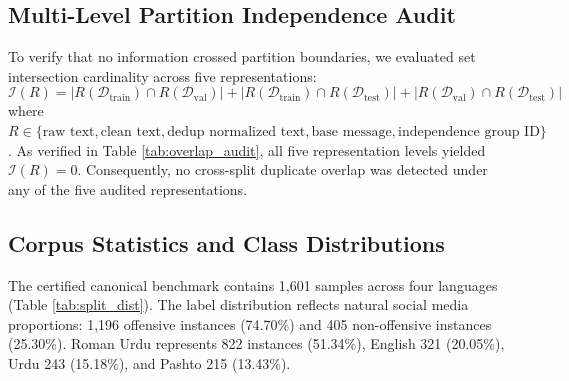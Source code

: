 \documentclass[11pt,a4paper]{article}
\begin{document}
\subsection{Multi-Level Partition Independence Audit}
To verify that no information crossed partition boundaries, we evaluated set intersection cardinality across five representations:
\begin{equation}
    \mathcal{I}(R) = |R(\mathcal{D}_{\text{train}}) \cap R(\mathcal{D}_{\text{val}})| + |R(\mathcal{D}_{\text{train}}) \cap R(\mathcal{D}_{\text{test}})| + |R(\mathcal{D}_{\text{val}}) \cap R(\mathcal{D}_{\text{test}})|
\end{equation}
where $R \in \{\text{raw text}, \text{clean text}, \text{dedup normalized text}, \text{base message}, \text{independence group ID}\}$. As verified in Table \ref{tab:overlap_audit}, all five representation levels yielded $\mathcal{I}(R) = 0$. Consequently, no cross-split duplicate overlap was detected under any of the five audited representations.

\begin{table}[t]
\centering
\small
\caption{\textbf{Five-level cross-partition overlap audit across train, validation, and test splits.}}
\label{tab:overlap_audit}
\end{table}

\subsection{Corpus Statistics and Class Distributions}
The certified canonical benchmark contains 1,601 samples across four languages (Table \ref{tab:split_dist}). The label distribution reflects natural social media proportions: 1,196 offensive instances (74.70\%) and 405 non-offensive instances (25.30\%). Roman Urdu represents 822 instances (51.34\%), English 321 (20.05\%), Urdu 243 (15.18\%), and Pashto 215 (13.43\%).
\end{document}
